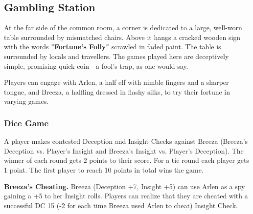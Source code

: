 \subsection*{Gambling Station}
{\entryfont At the far side of the common room, a corner is dedicated to a large, well-worn table surrounded by mismatched chairs. Above it hangs a cracked wooden sign with the words \textbf{"Fortune's Folly"} scrawled in faded paint. The table is surrounded by locals and travellers. The games played here are deceptively simple, promising quick coin - a fool's trap, as one would say.

Players can engage with Arlen, a half elf with nimble fingers and a sharper tongue, and Breeza, a halfling dressed in flashy silks, to try their fortune in varying games.}

\subsubsection*{Dice Game}
{\entryfont A player makes contested Deception and Insight Checks against Breeza (Breeza's Deception vs. Player's Insight and Breeza's Insight vs. Player's Deception).  The winner of each round gets 2 points to their score. For a tie round each player gets 1 point. The first player to reach 10 points in total wins the game.

\noindent\textbf{Breeza's Cheating.} Breeza (Deception +7, Insight +5) can use Arlen as a spy gaining a +5 to her Insight rolls. Players can realize that they are cheated with a successful DC 15 (-2 for each time Breeza used Arlen to cheat) Insight Check.}

